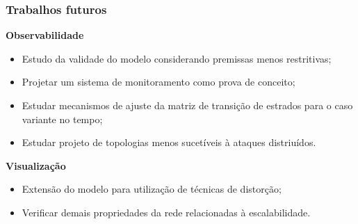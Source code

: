 \documentclass[10pt]{beamer}
\begin{document}
\begin{frame}
    \frametitle{Trabalhos futuros}

{\bf Observabilidade}

\begin{itemize}
\item Estudo da validade do modelo considerando premissas menos restritivas;
\item Projetar um sistema de monitoramento como prova de conceito;
\item Estudar mecanismos de ajuste da matriz de transição de estrados para o
    caso variante no tempo;
\item Estudar projeto de topologias menos sucetíveis à ataques distriuídos.
\end{itemize}

\vfill

{\bf Visualização}

\begin{itemize}
\item Extensão do modelo para utilização de técnicas de distorção;
\item Verificar demais propriedades da rede relacionadas à escalabilidade.
\end{itemize}

\end{frame}
\end{document}
